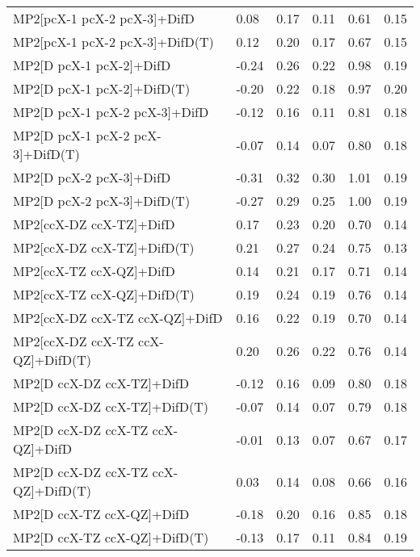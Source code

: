 \begin{table}
\begin{tabular}{l l l l l l }
    MP2[pcX-1 pcX-2 pcX-3]+DifD & 0.08 & 0.17 & 0.11 & 0.61 & 0.15 \\ 
    MP2[pcX-1 pcX-2 pcX-3]+DifD(T) & 0.12 & 0.20 & 0.17 & 0.67 & 0.15 \\ 
    MP2[D pcX-1 pcX-2]+DifD & -0.24 & 0.26 & 0.22 & 0.98 & 0.19 \\ 
    MP2[D pcX-1 pcX-2]+DifD(T) & -0.20 & 0.22 & 0.18 & 0.97 & 0.20 \\ 
    MP2[D pcX-1 pcX-2 pcX-3]+DifD & -0.12 & 0.16 & 0.11 & 0.81 & 0.18 \\ 
    MP2[D pcX-1 pcX-2 pcX-3]+DifD(T) & -0.07 & 0.14 & 0.07 & 0.80 & 0.18 \\ 
    MP2[D pcX-2 pcX-3]+DifD & -0.31 & 0.32 & 0.30 & 1.01 & 0.19 \\ 
    MP2[D pcX-2 pcX-3]+DifD(T) & -0.27 & 0.29 & 0.25 & 1.00 & 0.19 \\ 
    MP2[ccX-DZ ccX-TZ]+DifD & 0.17 & 0.23 & 0.20 & 0.70 & 0.14 \\ 
    MP2[ccX-DZ ccX-TZ]+DifD(T) & 0.21 & 0.27 & 0.24 & 0.75 & 0.13 \\ 
    MP2[ccX-TZ ccX-QZ]+DifD & 0.14 & 0.21 & 0.17 & 0.71 & 0.14 \\ 
    MP2[ccX-TZ ccX-QZ]+DifD(T) & 0.19 & 0.24 & 0.19 & 0.76 & 0.14 \\ 
    MP2[ccX-DZ ccX-TZ ccX-QZ]+DifD & 0.16 & 0.22 & 0.19 & 0.70 & 0.14 \\ 
    MP2[ccX-DZ ccX-TZ ccX-QZ]+DifD(T) & 0.20 & 0.26 & 0.22 & 0.76 & 0.14 \\ 
    MP2[D ccX-DZ ccX-TZ]+DifD & -0.12 & 0.16 & 0.09 & 0.80 & 0.18 \\ 
    MP2[D ccX-DZ ccX-TZ]+DifD(T) & -0.07 & 0.14 & 0.07 & 0.79 & 0.18 \\ 
    MP2[D ccX-DZ ccX-TZ ccX-QZ]+DifD & -0.01 & 0.13 & 0.07 & 0.67 & 0.17 \\ 
    MP2[D ccX-DZ ccX-TZ ccX-QZ]+DifD(T) & 0.03 & 0.14 & 0.08 & 0.66 & 0.16 \\ 
    MP2[D ccX-TZ ccX-QZ]+DifD & -0.18 & 0.20 & 0.16 & 0.85 & 0.18 \\ 
    MP2[D ccX-TZ ccX-QZ]+DifD(T) & -0.13 & 0.17 & 0.11 & 0.84 & 0.19 \\ 
    \bottomrule
  \end{tabular}
\end{table}

